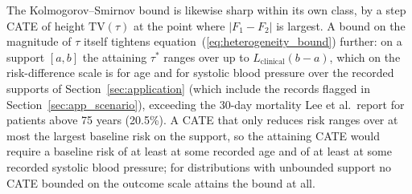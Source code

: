 \documentclass[AMA,Times1COL]{WileyNJDv5}
\begin{document}
The Kolmogorov--Smirnov bound is likewise sharp within its own class, by a step CATE of height $\mathrm{TV}(\tau)$ at the point where $|F_1 - F_2|$ is largest. A bound on the magnitude of $\tau$ itself tightens equation~(\ref{eq:heterogeneity_bound}) further: on a support $[a, b]$ the attaining $\tau^*$ ranges over up to $L_{\text{clinical}} (b - a)$, which on the risk-difference scale is  for age and  for systolic blood pressure over the recorded supports of Section~\ref{sec:application} (which include the records flagged in Section~\ref{sec:app_scenario}), exceeding the 30-day mortality Lee et al.\ report for patients above 75 years (20.5\%).\cite{lee1995} A CATE that only reduces risk ranges over at most the largest baseline risk on the support, so the attaining CATE would require a baseline risk of at least  at some recorded age and of at least  at some recorded systolic blood pressure; for distributions with unbounded support no CATE bounded on the outcome scale attains the bound at all.
\end{document}

